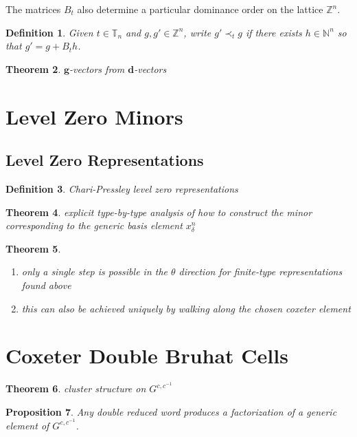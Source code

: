 \documentclass{amsart}
\newtheorem{theorem}{Theorem}
\newtheorem{definition}[theorem]{Definition}
\newtheorem{proposition}[theorem]{Proposition}
\newcommand{\bfd}{\mathbf{d}}
\newcommand{\bfg}{\mathbf{g}}
\newcommand{\NN}{\mathbb{N}}
\newcommand{\TT}{\mathbb{T}}
\newcommand{\ZZ}{\mathbb{Z}}
\begin{document}
    The matrices $B_t$ also determine a particular dominance order on the lattice $\ZZ^n$.
    \begin{definition}
      Given $t\in\TT_n$ and $g,g'\in\ZZ^n$, write $g'\prec_t g$ if there exists $h\in\NN^n$ so that $g'=g+B_t h$.
    \end{definition}

    \begin{theorem}
      $\bfg$-vectors from $\bfd$-vectors
    \end{theorem}

  \section{Level Zero Minors}
    \subsection{Level Zero Representations}
    \begin{definition}
      Chari-Pressley level zero representations
    \end{definition}

    \begin{theorem}
      explicit type-by-type analysis of how to construct the minor corresponding to the generic basis element $x_{\delta}^n$
    \end{theorem}

    \begin{theorem}
      \mbox{}
      \begin{enumerate}
        \item only a single step is possible in the $\theta$ direction for finite-type representations found above
        \item this can also be achieved uniquely by walking along the chosen coxeter element
      \end{enumerate}
    \end{theorem}

  \section{Coxeter Double Bruhat Cells}
    \begin{theorem}
      cluster structure on $G^{c,c^{-1}}$
    \end{theorem}

    \begin{proposition}
      \cite[Prop. 2.2]{rsw19}
      Any double reduced word produces a factorization of a generic element of $G^{c,c^{-1}}$.
    \end{proposition}
    
\end{document}
